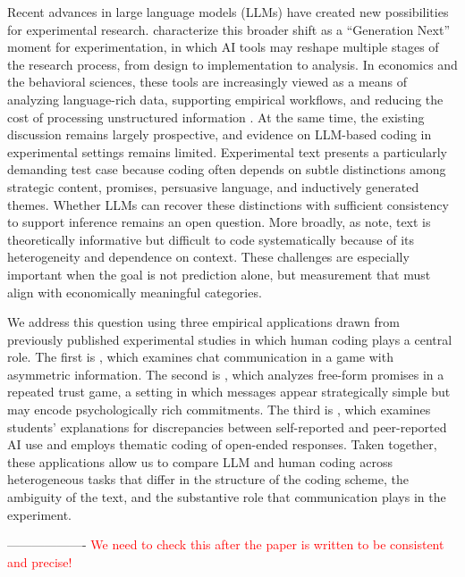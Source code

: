 \documentclass[11pt]{article}
\begin{document}
\begin{sloppypar}
Recent advances in large language models (LLMs) have created new possibilities for experimental research. \citet{charness2023generation} characterize this broader shift as a ``Generation Next'' moment for experimentation, in which AI tools may reshape multiple stages of the research process, from design to implementation to analysis. In economics and the behavioral sciences, these tools are increasingly viewed as a means of analyzing language-rich data, supporting empirical workflows, and reducing the cost of processing unstructured information \citep{charness2023generation,ludwig2025large}. At the same time, the existing discussion remains largely prospective, and evidence on LLM-based coding in experimental settings remains limited. Experimental text presents a particularly demanding test case because coding often depends on subtle distinctions among strategic content, promises, persuasive language, and inductively generated themes. Whether LLMs can recover these distinctions with sufficient consistency to support inference remains an open question. More broadly, as \citet{gentzkow2019text} note, text is theoretically informative but difficult to code systematically because of its heterogeneity and dependence on context. These challenges are especially important when the goal is not prediction alone, but measurement that must align with economically meaningful categories.

We address this question using three empirical applications drawn from previously published experimental studies in which human coding plays a central role. The first is \citet{brandts_cooper_2025}, which examines chat communication in a game with asymmetric information. The second is \citet{ederer_schneider_2022}, which analyzes free-form promises in a repeated trust game, a setting in which messages appear strategically simple but may encode psychologically rich commitments. The third is \citet{ling2025underreporting}, which examines students’ explanations for discrepancies between self-reported and peer-reported AI use and employs thematic coding of open-ended responses. Taken together, these applications allow us to compare LLM and human coding across heterogeneous tasks that differ in the structure of the coding scheme, the ambiguity of the text, and the substantive role that communication plays in the experiment.



-------------------
 \textcolor{red}{We need to check this after the paper is written to be consistent and precise!}



\end{sloppypar}
\end{document}
